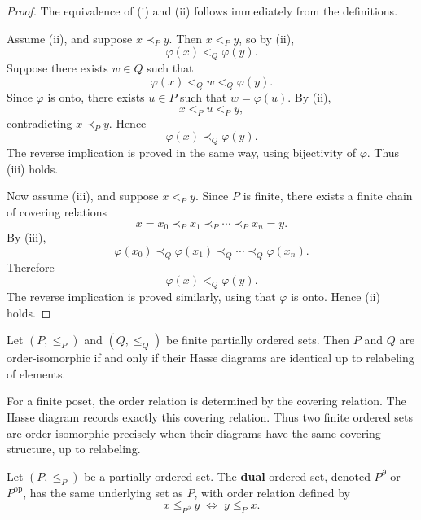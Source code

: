 \begin{proof}
The equivalence of (i) and (ii) follows immediately from the definitions.

Assume (ii), and suppose $x \prec_P y$. Then $x <_P y$, so by (ii),
\[
\varphi(x) <_Q \varphi(y).
\]
Suppose there exists $w \in Q$ such that
\[
\varphi(x) <_Q w <_Q \varphi(y).
\]
Since $\varphi$ is onto, there exists $u \in P$ such that $w=\varphi(u)$. By (ii),
\[
x <_P u <_P y,
\]
contradicting $x \prec_P y$. Hence
\[
\varphi(x) \prec_Q \varphi(y).
\]
The reverse implication is proved in the same way, using bijectivity of $\varphi$. Thus (iii) holds.

Now assume (iii), and suppose $x <_P y$. Since $P$ is finite, there exists a finite chain of covering relations
\[
x=x_0 \prec_P x_1 \prec_P \cdots \prec_P x_n=y.
\]
By (iii),
\[
\varphi(x_0) \prec_Q \varphi(x_1) \prec_Q \cdots \prec_Q \varphi(x_n).
\]
Therefore
\[
\varphi(x) <_Q \varphi(y).
\]
The reverse implication is proved similarly, using that $\varphi$ is onto. Hence (ii) holds.
\end{proof}


\begin{proposition}
Let $(P,\le_P)$ and $(Q,\le_Q)$ be finite partially ordered sets. Then $P$ and $Q$ are order-isomorphic if and only if their Hasse diagrams are identical up to relabeling of elements.
\end{proposition}

\begin{remark}[Interpretation]
For a finite poset, the order relation is determined by the covering relation. The Hasse diagram records exactly this covering relation. Thus two finite ordered sets are order-isomorphic precisely when their diagrams have the same covering structure, up to relabeling.
\end{remark}



\begin{definition}
Let $(P,\le_P)$ be a partially ordered set. The \textbf{dual} ordered set, denoted $P^{\partial}$ or $P^{\mathrm{op}}$, has the same underlying set as $P$, with order relation defined by
\[
x \le_{P^{\partial}} y
\;\Longleftrightarrow\;
y \le_P x.
\]
\end{definition}

